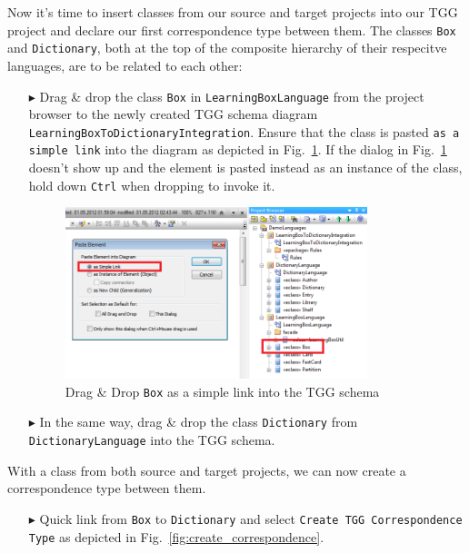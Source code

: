 Now it's time to insert classes from our source and target projects into our TGG project and declare our first correspondence type between them.
The classes \texttt{Box} and \texttt{Dictionary}, both at the top of the composite hierarchy of their respecitve languages, are to be related to each other:
\begin{enumerate}
\item[$\blacktriangleright$] Drag \& drop the class \texttt{Box} in \texttt{Learning\-Box\-Language} from the project 
browser to the newly created TGG schema diagram \texttt{Learning\-Box\-To\-Dictionary\-Integration}.
Ensure that the class is pasted \texttt{as a simple link} into the diagram as depicted in Fig.~\ref{fig:drag_drop_box}. 
If the dialog in Fig.~\ref{fig:drag_drop_box} doesn't show up and the element is pasted instead as an instance of the class, hold down \texttt{Ctrl} when dropping to invoke it.

\begin{figure}[htbp]
\begin{center}
  \includegraphics[width=0.83\textwidth]{pics/tggBilder/tggSchema/tgg4}
  \caption{Drag \& Drop \texttt{Box} as a simple link into the TGG schema} 
  \label{fig:drag_drop_box}
\end{center}
\end{figure}

\item[$\blacktriangleright$] In the same way, drag \& drop the class \texttt{Dictionary} from \texttt{Dictionary\-Language} into the TGG schema. 
\end{enumerate}

With a class from both source and target projects, we can now create a correspondence type between them.
\begin{enumerate}
\item[$\blacktriangleright$] Quick link from \texttt{Box} to \texttt{Dictionary} and select \texttt{Create TGG Corres\-pon\-dence Type} as depicted in Fig.~\ref{fig:create_correspondence}.
\end{enumerate}

